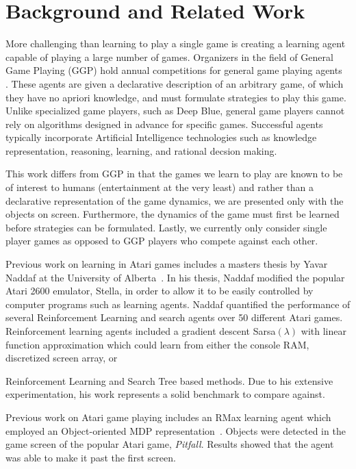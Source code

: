 \documentclass{acm_proc_article-sp}
\begin{document}
\section{Background and Related Work}
\label{sec:background}
More challenging than learning to play a single game is creating a learning agent capable of playing a large number of games. Organizers in the field of General Game Playing (GGP) hold annual competitions for general game playing agents~\cite{genesereth05} . These agents are given a declarative description of an arbitrary game, of which they have no apriori knowledge, and must formulate strategies to play this game. Unlike specialized game players, such as Deep Blue, general game players cannot rely on algorithms designed in advance for specific games. Successful agents typically incorporate Artificial Intelligence technologies such as knowledge representation, reasoning, learning, and rational decsion making. 

This work differs from GGP in that the games we learn to play are known to be of interest to humans (entertainment at the very least) and rather than a declarative representation of the game dynamics, we are presented only with the objects on screen. Furthermore, the dynamics of the game must first be learned before strategies can be formulated. Lastly, we currently only consider single player games as opposed to GGP players who compete against each other.

Previous work on learning in Atari games includes a masters thesis by Yavar Naddaf at the University of Alberta~\cite{naddaf10}. In his thesis, Naddaf modified the popular Atari 2600 emulator, Stella, in order to allow it to be easily controlled by computer programs such as learning agents. Naddaf quantified the performance of several Reinforcement Learning and search agents over 50 different Atari games. Reinforcement learning agents included a gradient descent Sarsa$(\lambda)$ with linear function approximation which could learn from either the console RAM, discretized screen array, or 

 Reinforcement Learning and Search Tree based methods. Due to his extensive experimentation, his work represents a solid benchmark to compare against. 

 Previous work on Atari game playing includes an RMax learning agent which employed an Object-oriented MDP representation~\cite{duik08}. Objects were detected in the game screen of the popular Atari game, \emph{Pitfall}. Results showed that the agent was able to make it past the first screen.
\end{document}
